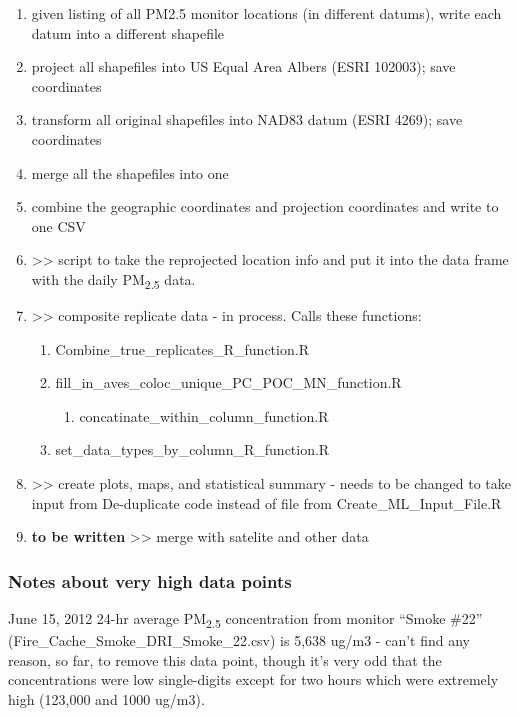 \begin{enumerate}[nolistsep]
\begin{enumerate}[nolistsep]
	\end{enumerate}

\item {} given listing of all PM2.5 monitor locations (in different datums), write each datum into a different shapefile
\item {} project all shapefiles into US Equal Area Albers (ESRI 102003); save coordinates
\item {} transform all original shapefiles into NAD83 datum (ESRI 4269); save coordinates 
\item {} merge all the shapefiles into one
\item {} combine the geographic coordinates and projection coordinates and write to one CSV

\item {} >> script to take the reprojected location info and put it into the data frame with the daily PM\textsubscript{2.5} data.

\item {} >> composite replicate data - in process. Calls these functions:
  \begin{enumerate}
  \item Combine\_true\_replicates\_R\_function.R
  \item fill\_in\_aves\_coloc\_unique\_PC\_POC\_MN\_function.R
    \begin{enumerate}
    \item concatinate\_within\_column\_function.R
    \end{enumerate}
  \item set\_data\_types\_by\_column\_R\_function.R
  \end{enumerate}
\item {} >> create plots, maps, and statistical summary - needs to be changed to take input from De-duplicate code instead of file from Create\_ML\_Input\_File.R
\item \textbf{to be written} >> merge with satelite and other data
\end{enumerate}

\subsubsection{Notes about very high data points}

June 15, 2012 24-hr average PM\textsubscript{2.5} concentration from monitor ``Smoke \#22'' (Fire\_Cache\_Smoke\_DRI\_Smoke\_22.csv) is 5,638 ug/m3 - can't find any reason, so far, to remove this data point, though it's very odd that the concentrations were low single-digits except for two hours which were extremely high (123,000 and 1000 ug/m3).



